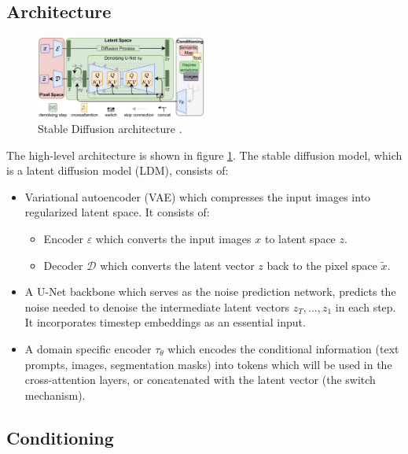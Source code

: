 \subsection{Architecture}

\begin{figure}
    \centering
    \includegraphics[width=0.5\textwidth]{images/diffusion_models/stable_diffusion/architecture.png}
    \caption{Stable Diffusion architecture \cite{stable_diffusion}.}
    \label{fig:stable_diffusion_architecture}
\end{figure}

The high-level architecture is shown in figure \ref{fig:stable_diffusion_architecture}. The stable diffusion model, which is a latent diffusion model (LDM), consists of: 

\begin{itemize}
    \item Variational autoencoder (VAE) which compresses the input images into regularized latent space. It consists of:
    \begin{itemize}
        \item Encoder $\varepsilon$ which converts the input images $x$ to latent space $z$.
        \item Decoder $\mathcal{D}$ which converts the latent vector $z$ back to the pixel space $\tilde{x}$.
    \end{itemize}
    \item A U-Net backbone which serves as the noise prediction network, predicts the noise needed to denoise the intermediate latent vectors $z_T, ..., z_1$ in each step. It incorporates timestep embeddings as an essential input.
    \item A domain specific encoder $\tau_\theta$ which encodes the conditional information (text prompts, images, segmentation masks) into tokens which will be used in the cross-attention layers, or concatenated with the latent vector (the switch mechanism).
\end{itemize}







\subsection{Conditioning}

